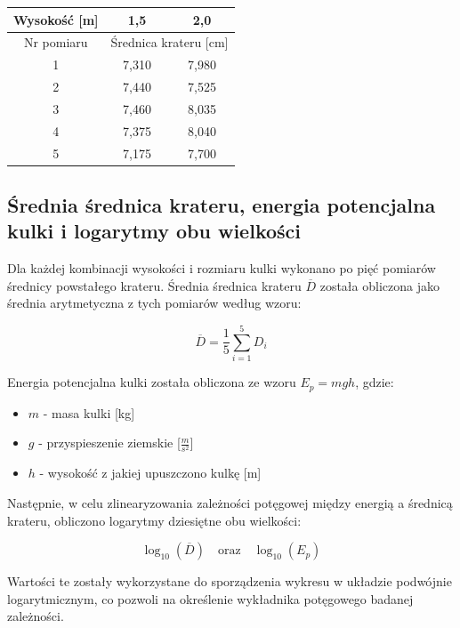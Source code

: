 \documentclass[a4paper,12pt]{article}
\begin{document}
\begin{center}
    \begin{tabular}{|c|c|c|}
        \hline
        Wysokość [m] & 1,5 & 2,0 \\
        \hline
        Nr pomiaru & \multicolumn{2}{c|}{Średnica krateru [cm]} \\
        \hline
        1 & 7,310 & 7,980 \\
        2 & 7,440 & 7,525 \\
        3 & 7,460 & 8,035 \\
        4 & 7,375 & 8,040 \\
        5 & 7,175 & 7,700 \\
        \hline
    \end{tabular}
    \label{tab:kratery_duza}
\end{center}


\subsection{Średnia średnica krateru, energia potencjalna kulki i logarytmy obu wielkości}


Dla każdej kombinacji wysokości i rozmiaru kulki wykonano po pięć pomiarów średnicy powstałego krateru. Średnia średnica krateru $\overline{D}$ została obliczona jako średnia arytmetyczna z tych pomiarów według wzoru:

\[ \overline{D} = \frac{1}{5}\sum_{i=1}^{5} D_i \]

Energia potencjalna kulki została obliczona ze wzoru $E_p = mgh$, gdzie:
\begin{itemize}
    \item $m$ - masa kulki [kg]
    \item $g$ - przyspieszenie ziemskie [$\frac{m}{s^2}$]
    \item $h$ - wysokość z jakiej upuszczono kulkę [m]
\end{itemize}

Następnie, w celu zlinearyzowania zależności potęgowej między energią a średnicą krateru, obliczono logarytmy dziesiętne obu wielkości:

\[ \log_{10}(\overline{D}) \quad \text{oraz} \quad \log_{10}(E_p) \]

Wartości te zostały wykorzystane do sporządzenia wykresu w układzie podwójnie logarytmicznym, co pozwoli na określenie wykładnika potęgowego badanej zależności.
\end{document}
